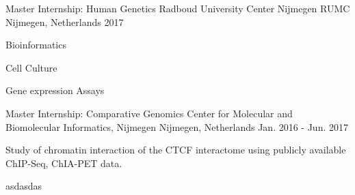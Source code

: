 

\begin{cventries}

  \cventry
    {Master Internship:} %
    {Human Genetics} %
    {Radboud University Center Nijmegen RUMC} %
    {Nijmegen, Netherlands}
    {2017} %
    {
      \begin{cvitems} %
        \item {Bioinformatics}
        \item {Cell Culture}
        \item {Gene expression Assays}
      \end{cvitems}
    }

  \cventry
    {Master Internship:} %
    {Comparative Genomics} %
    {Center for Molecular and Biomolecular Informatics, Nijmegen} %
    {Nijmegen, Netherlands} %
    {Jan. 2016 - Jun. 2017} %
    {
      \begin{cvitems} %
        \item {Study of chromatin interaction of the CTCF interactome using publicly available ChIP-Seq, ChIA-PET data.}
        \item {asdasdas}
      \end{cvitems}
    }
\end{cventries}
